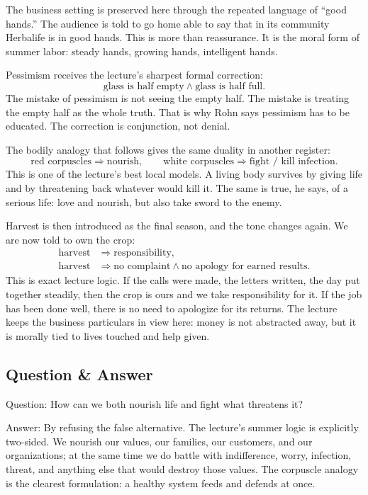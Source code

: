 The business setting is preserved here through the repeated language of ``good hands.'' The audience is told to go home able to say that in its community Herbalife is in good hands. This is more than reassurance. It is the moral form of summer labor: steady hands, growing hands, intelligent hands.

Pessimism receives the lecture's sharpest formal correction:
\begin{equation}
\text{glass is half empty} \land \text{glass is half full}.
\end{equation}
The mistake of pessimism is not seeing the empty half. The mistake is treating the empty half as the whole truth. That is why Rohn says pessimism has to be educated. The correction is conjunction, not denial.

The bodily analogy that follows gives the same duality in another register:
\begin{equation}
\text{red corpuscles} \Rightarrow \text{nourish}, \qquad
\text{white corpuscles} \Rightarrow \text{fight / kill infection}.
\end{equation}
This is one of the lecture's best local models. A living body survives by giving life and by threatening back whatever would kill it. The same is true, he says, of a serious life: love and nourish, but also take sword to the enemy.

Harvest is then introduced as the final season, and the tone changes again. We are now told to own the crop:
\begin{align}
\text{harvest} &\Rightarrow \text{responsibility},\\
\text{harvest} &\Rightarrow \text{no complaint} \land \text{no apology for earned results}.
\end{align}
This is exact lecture logic. If the calls were made, the letters written, the day put together steadily, then the crop is ours and we take responsibility for it. If the job has been done well, there is no need to apologize for its returns. The lecture keeps the business particulars in view here: money is not abstracted away, but it is morally tied to lives touched and help given.

\subsection{Question \& Answer}

Question: How can we both nourish life and fight what threatens it?

Answer: By refusing the false alternative. The lecture's summer logic is explicitly two-sided. We nourish our values, our families, our customers, and our organizations; at the same time we do battle with indifference, worry, infection, threat, and anything else that would destroy those values. The corpuscle analogy is the clearest formulation: a healthy system feeds and defends at once.

